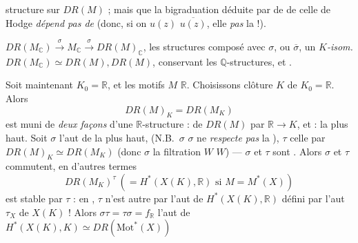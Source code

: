 \documentclass[11pt,a4paper]{article}
\begin{document}

 structure  sur 
$DR(M)$ ; mais \ill{}  que la bigraduation déduite
 par  de  de celle
de Hodge  \ill{} \emph{dépend pas de} \ill{} (donc, si on
 \ill{} $u(z)$  $\overline{u(z)}$, elle
 \emph{pas}  \ill{} la
 !).

  \ill{}
$DR(M_{\mathbb{C}}) \xrightarrow{\ \sigma\ } M_{\mathbb{C}} \xrightarrow{\ \sigma\ } DR(M)_{\mathbb{C}}$,
les structures \ill{}
 composé avec $\sigma$, ou $\overline{\sigma}$,
 un \emph{$K$-isom.}
$DR(M_{\mathbb{C}}) \simeq DR(M), DR(M)$, conservant les
$\mathbb{Q}$-structures, et  
.


 Soit maintenant  $K_{0} = \mathbb{R}$, et
 les motifs $M$  $\mathbb{R}$. Choisissons
\ill{}  clôture  $K$ de $K_{0} = \mathbb{R}$.
 Alors
\[
  DR(M)_{K} = DR(M_{K})
\]
est muni de \emph{deux  façons} d'une $\mathbb{R}$-structure :
   de $DR(M)$ par
$\mathbb{R} \to K$, et  : la 
 plus haut. Soit $\sigma$ l'aut de la
   plus haut,
(N.B.\ $\sigma$ \ill{} $\sigma$ ne \emph{respecte pas} la
 ), $\tau$ celle
 par \ill{} $DR(M)_{K} \simeq DR(M_{K})$ (donc $\sigma$
 la filtration $W$ \ill{} $W$) --- $\sigma$ et $\tau$ sont
.  Alors $\sigma$ et $\tau$
commutent, en d'autres termes \ill{}
\[
  DR(M_{K})^{\tau}\ \left(= H^{*}(X(K), \mathbb{R}) \text{ si } M = M^{*}(X)\right)
\]
est stable par $\tau$ : en , $\tau$ n'est autre \ill{} par
l'aut de \ill{} $H^{*}(X(K), \mathbb{R})$ défini par
l'aut $\tau_{X}$ de \ill{} $X(K)$ ! Alors
$\sigma\tau = \tau\sigma = f_{\mathbb{R}}$ \ill{} l'aut de
 $H^{*}(X(K), K) \simeq DR(\mathrm{Mot}^{*}(X))$
\end{document}
